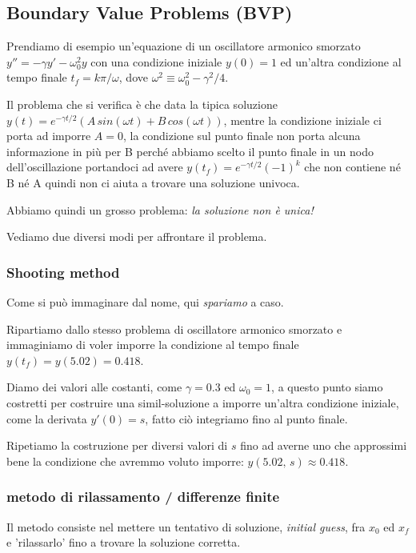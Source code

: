 \documentclass{article}
\begin{document}
	\subsection{Boundary Value Problems (BVP)}
	
	Prendiamo di esempio un'equazione di un oscillatore armonico smorzato $y''=-\gamma y' -\omega_0^2 y$ con una condizione iniziale $y(0)=1$ ed un'altra condizione al tempo finale $t_f=k\pi/\omega$, dove $\omega^2 \equiv \omega^2_0-\gamma^2/4$.
	
	Il problema che si verifica è che data la tipica soluzione $y(t)=e^{-\gamma t/2}(A\,sin(\omega t)+B\,cos(\omega t))$, mentre la condizione iniziale ci porta ad imporre $A=0$, la condizione sul punto finale non porta alcuna informazione in più per B perché abbiamo scelto il punto finale in un nodo dell'oscillazione portandoci ad avere $y(t_f)=e^{-\gamma t/2} (-1)^k$ che non contiene né B né A quindi non ci aiuta a trovare una soluzione univoca.
	
	Abbiamo quindi un grosso problema: \emph{la soluzione non è unica!}
	
	Vediamo due diversi modi per affrontare il problema.
	
	\subsubsection{Shooting method}
	Come si può immaginare dal nome, qui \emph{spariamo} a caso.
	
	Ripartiamo dallo stesso problema di oscillatore armonico smorzato e immaginiamo di voler imporre la condizione al tempo finale $y(t_f)=y(5.02)=0.418$.
	
	Diamo dei valori alle costanti, come $\gamma=0.3$ ed $\omega_0=1$, a questo punto siamo costretti per costruire una simil-soluzione a imporre un'altra condizione iniziale, come la derivata $y'(0)=s$, fatto ciò integriamo fino al punto finale.
	
	Ripetiamo la costruzione per diversi valori di $s$ fino ad averne uno che approssimi bene la condizione che avremmo voluto imporre: $y(5.02,\, s)\approx0.418$.
	
	\subsubsection{metodo di rilassamento / differenze finite}
	
	Il metodo consiste nel mettere un tentativo di soluzione, \emph{initial guess}, fra $x_0$ ed $x_f$ e 'rilassarlo' fino a trovare la soluzione corretta.
	
\end{document}
